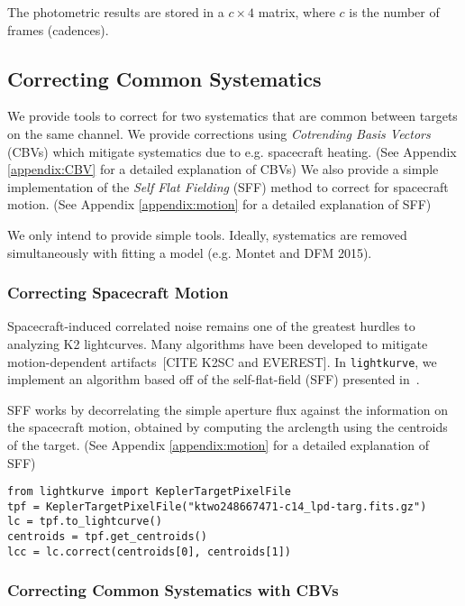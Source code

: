 \documentclass[twocolumn]{aastex62}
\newcommand{\lightkurve}{\texttt{lightkurve}}
\begin{document}
        The photometric results are stored in a $c \times 4$ matrix, where $c$ is the
        number of frames (cadences).

\subsection{Correcting Common Systematics}

    We provide tools to correct for two systematics that are common between targets on the same channel.
    We provide corrections using \emph{Cotrending Basis Vectors} (CBVs) which mitigate systematics due to e.g. spacecraft heating. (See Appendix \ref{appendix:CBV} for a detailed explanation of CBVs)
    We also provide a simple implementation of the \emph{Self Flat Fielding} (SFF) method to correct for spacecraft motion. (See Appendix \ref{appendix:motion} for a detailed explanation of SFF)

    We only intend to provide simple tools.
    Ideally, systematics are removed simultaneously with fitting a model (e.g. Montet and DFM 2015).


    \subsubsection{Correcting Spacecraft Motion}
        Spacecraft-induced correlated noise remains one of the greatest hurdles to
        analyzing K2 lightcurves. Many algorithms have been developed to mitigate
        motion-dependent artifacts~\cite{vanderburg2014}[CITE K2SC and EVEREST].
        In \lightkurve, we implement an algorithm based off of the self-flat-field
        (SFF) presented in~\cite{vanderburg2014}.

        SFF works by decorrelating the simple aperture flux
        against the information on the spacecraft motion, obtained by computing the
        arclength using the centroids of the target. (See Appendix \ref{appendix:motion} for a detailed explanation of SFF)

\begin{verbatim}
from lightkurve import KeplerTargetPixelFile
tpf = KeplerTargetPixelFile("ktwo248667471-c14_lpd-targ.fits.gz")
lc = tpf.to_lightcurve()
centroids = tpf.get_centroids()
lcc = lc.correct(centroids[0], centroids[1])
\end{verbatim}


    \subsubsection{Correcting Common Systematics with CBVs}
\end{document}
